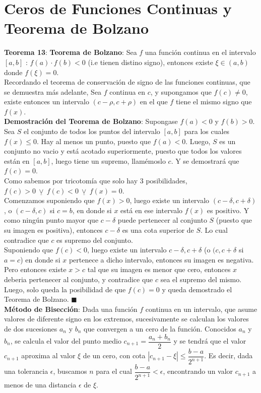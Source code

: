 \documentclass[11pt,a4paper]{article}
\newcommand*{\QEDA}{\null\nobreak\hfill\ensuremath{\blacksquare}}
\begin{document}
\section{Ceros de Funciones Continuas y Teorema de Bolzano}
\noindent \textbf{Teorema 13}: \textbf{Teorema de Bolzano}: Sea $f$ una funci\'on continua en el intervalo $[a,b]$ : $f(a)\cdot f(b) < 0$ (i.e tienen distino signo), entonces existe $\xi \in (a,b)$ donde $f(\xi) = 0$.\\
\indent Recordando el teorema de conservaci\'on de signo de las funciones continuas, que se demuestra m\'as adelante, Sea $f$ continua en $c$, y supongamos que $f(c)\not = 0$, existe entonces un intervalo $(c-\rho, c+\rho)$ en el que $f$ tiene el mismo signo que $f(x)$.\\
\textbf{Demostraci\'on del Teorema de Bolzano}: Supongase $f(a)<0$ y $f(b)>0$. Sea $S$ el conjunto de todos los puntos del intervalo $[a,b]$ para los cuales $f(x)\leq 0$. Hay al menos un punto, puesto que $f(a) < 0$. Luego, $S$ es un conjunto no vacio y est\'a acotado superiormente, puesto que todos los valores est\'an en $[a,b]$, luego tiene un supremo, llam\'emoslo $c$. Y se demostrar\'a que $f(c)=0$.\\
\indent Como sabemos por tricotom\'ia que solo hay 3 posibilidades, $f(c) > 0\ \underline{\lor}\ f(c) < 0\ \underline{\lor}\ f(x) = 0$.\\
\indent Comenzamos suponiendo que $f(x)>0$, luego existe un intervalo $(c-\delta, c+\delta)$, o $(c-\delta, c)$ si $c=b$, en donde si $x$ est\'a en ese intervalo $f(x)$ es positivo. Y como ning\'un punto mayor que $c-\delta$ puede pertenecer al conjunto $S$ (puesto que su imagen es positiva), entonces $c-\delta$ es una cota superior de $S$. Lo cual contradice que $c$ es supremo del conjunto.\\
\indent Suponiendo que $f(c) < 0$, luego existe un intervalo $c-\delta,c+\delta$ (o $(c, c+\delta$ si $a=c$) en donde si $x$ pertenece a dicho intervalo, entonces su imagen es negativa. Pero entonces existe $x > c$ tal que su imagen es menor que cero, entonces $x$ deberia pertenecer al conjunto, y contradice que $c$ sea el supremo del mismo.\\ 
\indent Luego, solo queda la posibilidad de que $f(c)=0$ y queda demostrado el Teorema de Bolzano. \QEDA\\

\noindent \textbf{M\'etodo de Bisecci\'on}: Dada una funci\'on $f$ continua en un intervalo, que asume valores de diferente signo en los extremos, sucesivamente se calculan los valores de dos sucesiones $a_n$ y $b_n$ que convergen a un cero de la funci\'on. Conocidos $a_n$ y $b_n$, se calcula el valor del punto medio $c_{n+1} = \dfrac{a_n+b_n}{2}$ y se tendr\'a que el valor $c_{n+1}$ aproxima al valor $\xi$ de un cero, con cota $|c_{n+1} - \xi| \leq \dfrac{b-a}{2^{n+1}}$. Es decir, dada una tolerancia $\epsilon$, buscamos $n$ para el cual $\dfrac{b-a}{2^{n+1}} < \epsilon$, encontrando un valor $c_{n+1}$ a menos de una distancia $\epsilon$ de $\xi$.\\
\end{document}
